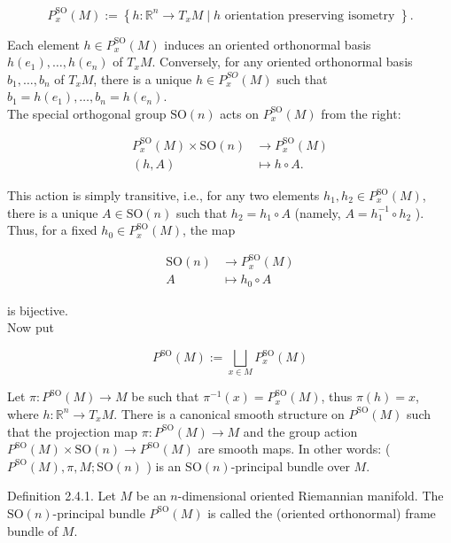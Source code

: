 \documentclass[10pt, letterpaper]{article}
\begin{document}
$$
P_{x}^{\mathrm{SO}}(M):=\left\{h: \mathbb{R}^{n} \rightarrow T_{x} M \mid h \text { orientation preserving isometry }\right\} .
$$

Each element $h \in P_{x}^{\mathrm{SO}}(M)$ induces an oriented orthonormal basis $h\left(e_{1}\right), \ldots, h\left(e_{n}\right)$ of $T_{x} M$. Conversely, for any oriented orthonormal basis $b_{1}, \ldots, b_{n}$ of $T_{x} M$, there is a unique $h \in P_{x}^{S O}(M)$ such that $b_{1}=h\left(e_{1}\right), \ldots, b_{n}=h\left(e_{n}\right)$.\\
The special orthogonal group $\mathrm{SO}(n)$ acts on $P_{x}^{\mathrm{SO}}(M)$ from the right:

$$
\begin{aligned}
P_{x}^{\mathrm{SO}}(M) \times \mathrm{SO}(n) & \rightarrow P_{x}^{\mathrm{SO}}(M) \\
(h, A) & \mapsto h \circ A .
\end{aligned}
$$

This action is simply transitive, i.e., for any two elements $h_{1}, h_{2} \in P_{x}^{\mathrm{SO}}(M)$, there is a unique $A \in \mathrm{SO}(n)$ such that $h_{2}=h_{1} \circ A$ (namely, $A=h_{1}^{-1} \circ h_{2}$ ).\\
Thus, for a fixed $h_{0} \in P_{x}^{\mathrm{SO}}(M)$, the map

$$
\begin{aligned}
\mathrm{SO}(n) & \rightarrow P_{x}^{\mathrm{SO}}(M) \\
A & \mapsto h_{0} \circ A
\end{aligned}
$$

is bijective.\\
Now put

$$
P^{\mathrm{SO}}(M):=\bigsqcup_{x \in M} P_{x}^{\mathrm{SO}}(M)
$$

Let $\pi: P^{\mathrm{SO}}(M) \rightarrow M$ be such that $\pi^{-1}(x)=P_{x}^{\mathrm{SO}}(M)$, thus $\pi(h)=x$, where $h: \mathbb{R}^{n} \rightarrow T_{x} M$. There is a canonical smooth structure on $P^{\mathrm{SO}}(M)$ such that the projection map $\pi: P^{\mathrm{SO}}(M) \rightarrow M$ and the group action $P^{\mathrm{SO}}(M) \times \mathrm{SO}(n) \rightarrow P^{\mathrm{SO}}(M)$ are smooth maps. In other words: ( $P^{\mathrm{SO}}(M), \pi, M ; \mathrm{SO}(n)$ ) is an $\mathrm{SO}(n)$-principal bundle over $M$.

Definition 2.4.1. Let $M$ be an $n$-dimensional oriented Riemannian manifold. The $\mathrm{SO}(n)$-principal bundle $P^{\mathrm{SO}}(M)$ is called the (oriented orthonormal) frame bundle of $M$.
\end{document}
